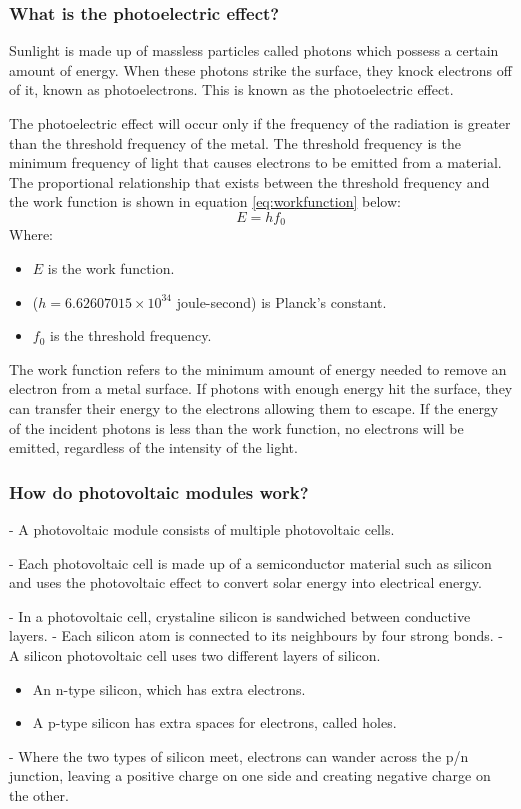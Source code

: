 \subsubsection{What is the photoelectric effect?}
Sunlight is made up of massless particles called photons which possess a certain amount of energy. When these photons strike the surface, they knock electrons off of it, known as photoelectrons. This is known as the photoelectric effect.\vspace{0.5em}

\noindent The photoelectric effect will occur only if the frequency of the radiation is greater than the threshold frequency of the metal. The threshold frequency is the minimum frequency of light that causes electrons to be emitted from a material. The proportional relationship that exists between the threshold frequency and the work function is shown in equation \ref{eq:workfunction} below:
\begin{equation}
    E = hf_0
    \label{eq:workfunction}
\end{equation}
Where:
\begin{itemize}
    \item $E$ is the work function.
    \item ($h = 6.62607015 \times 10^{34}$ joule-second) is Planck's constant.
    \item $f_0$ is the threshold frequency. 
\end{itemize}\vspace{0.5em}
\noindent The work function refers to the minimum amount of energy needed to remove an electron from a metal surface. If photons with enough energy hit the surface, they can transfer their energy to the electrons allowing them to escape. If the energy of the incident photons is less than the work function, no electrons will be emitted, regardless of the intensity of the light.\vspace{0.5em}

\subsubsection{How do photovoltaic modules work?}
- A photovoltaic module consists of multiple photovoltaic cells.\par
\noindent - Each photovoltaic cell is made up of a semiconductor material such as silicon and uses the photovoltaic effect to convert solar energy into electrical energy.\par
\noindent - In a photovoltaic cell, crystaline silicon is sandwiched between conductive layers.
\noindent - Each silicon atom is connected to its neighbours by four strong bonds.
\noindent - A silicon photovoltaic cell uses two different layers of silicon.
\begin{itemize}
    \item An n-type silicon, which has extra electrons.
    \item A p-type silicon has extra spaces for electrons, called holes.
\end{itemize}
\noindent - Where the two types of silicon meet, electrons can wander across the p/n junction, leaving a positive charge on one side and creating negative charge on the other.

